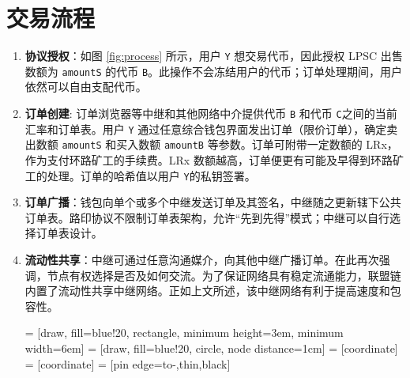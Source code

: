 \documentclass[UTF8,nofonts]{ctexart}%
\makeatletter
\newenvironment{figurehere}
 {\def\@captype{figure}}
 {}
\makeatother
\begin{document}
\begin{multicols}{2}
\begin{itemize}
\end{itemize}


\section{交易流程\label{sec:process}}



\begin{enumerate} 


\item \textbf{协议授权}：如图 \ref{fig:process} 所示，用户 \verb|Y| 想交易代币，因此授权 LPSC 出售数额为 \verb|amountS| 的代币 \verb|B|。此操作不会冻结用户的代币；订单处理期间，用户依然可以自由支配代币。

\item \textbf{订单创建}: 订单浏览器等中继和其他网络中介提供代币 \verb|B| 和代币 \verb|C|之间的当前汇率和订单表。用户 \verb|Y| 通过任意综合钱包界面发出订单（限价订单），确定卖出数额 \verb|amountS| 和买入数额 \verb|amountB| 等参数。订单可附带一定数额的 LRx，作为支付环路矿工的手续费。LRx 数额越高，订单便更有可能及早得到环路矿工的处理。订单的哈希值以用户 \verb|Y|的私钥签署。

\item \textbf{订单广播}：钱包向单个或多个中继发送订单及其签名，中继随之更新辖下公共订单表。路印协议不限制订单表架构，允许“先到先得”模式；中继可以自行选择订单表设计。

\item \textbf{流动性共享}：中继可通过任意沟通媒介，向其他中继广播订单。在此再次强调，节点有权选择是否及如何交流。为了保证网络具有稳定流通能力，联盟链内置了流动性共享中继网络。正如上文所述，该中继网络有利于提高速度和包容性。

\begin{center}
\begin{figurehere}
\centering
{} = [draw, fill=blue!20, rectangle, 
    minimum height=3em, minimum width=6em]
 = [draw, fill=blue!20, circle, node distance=1cm]
 = [coordinate]
 = [coordinate]
 = [pin edge={to-,thin,black}]

\begin{tikzpicture}[
    auto, 
    scale=0.7,
    node distance=2cm,
    >=latex',
    font=\bfseries\footnotesize\sffamily,
    order/.style={
		rectangle,
		scale=0.7,
		rounded corners,
		draw=black, 
		text centered,
		minimum height=12mm,
		minimum width=30mm,
		fill=white
	},
	role/.style={
		circle,
		scale=0.7,
		draw=black, 
		text centered,
		minimum height=12mm,
		minimum width=12mm,
		fill=white
	},
	steps/.style={
		circle,
		scale=0.7,
		draw=black, 
		text centered,
		fill=black,
		text=white
	},
	account/.style={
		circle,
		scale=0.7,
		draw=black, 
		text centered,
		minimum height=16mm,
		minimum width=16mm,
		fill=white
	},
	label/.style={
	  scale=0.7
    }
  ]


\end{tikzpicture}
\end{figurehere}
\end{center}
\end{enumerate}
\end{multicols}
\end{document}
